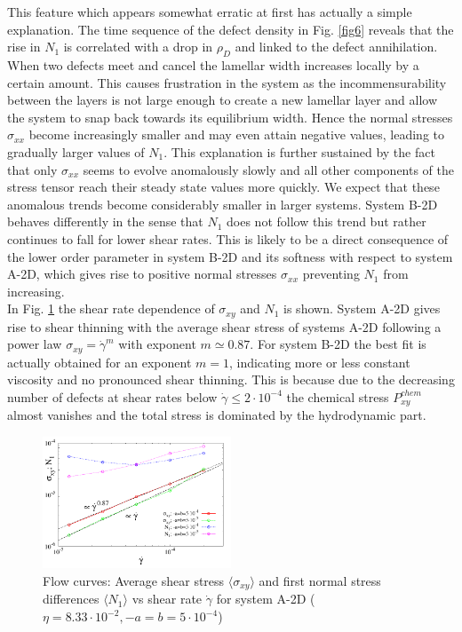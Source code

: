 \documentclass[8.5pt,twoside,twocolumn]{article}
\newcommand{\e}[1]{\cdot10^{#1}}
\begin{document}
This feature which appears somewhat erratic at first has actually a simple explanation. 
The time sequence of the defect density in Fig. \ref{fig6} reveals that the rise in $N_1$ is correlated with a drop in $\rho_D$ and linked to the defect annihilation.
When two defects meet and cancel the lamellar width increases locally by a certain amount.
This causes frustration in the system as the incommensurability between the layers is not large enough to create a new lamellar layer and allow the system to snap back towards its equilibrium width.
Hence the normal stresses $\sigma_{xx}$ become increasingly smaller and may even attain negative values, leading to gradually larger values of $N_1$.
This explanation is further sustained by the fact that only $\sigma_{xx}$ seems to evolve anomalously slowly and all other components of the stress tensor reach their steady state values more quickly.
We expect that these anomalous trends become considerably smaller in larger systems.
System B-2D behaves differently in the sense that $N_1$ does not follow this trend but rather continues to fall for lower shear rates. 
This is likely to be a direct consequence of the lower order parameter in system B-2D and its softness with respect to system A-2D, which gives rise to positive normal stresses $\sigma_{xx}$ preventing $N_1$ from increasing.\\
In Fig. \ref{fig11} the shear rate dependence of $\sigma_{xy}$ and $N_1$ is shown. 
System A-2D gives rise to shear thinning with the average shear stress of systems A-2D following a power law $\sigma_{xy}=\dot{\gamma}^m$ with exponent $m\simeq 0.87$.
For system B-2D the best fit is actually obtained for an exponent $m=1$, indicating more or less constant viscosity and no pronounced shear thinning.
This is because due to the decreasing number of defects at shear rates below $\dot{\gamma}\le2\e{-4}$ the chemical stress $P^{chem}_{xy}$ almost vanishes and the total stress is dominated by the hydrodynamic part.\\


\begin{figure}[htp!]
\centering
\includegraphics[angle=0,width=0.5\textwidth]{S_xy_N1_gammadot.pdf}
\caption{Flow curves: Average shear stress $\langle \sigma_{xy}\rangle$ and first normal stress differences $\langle N_1 \rangle$ vs shear rate $\dot{\gamma}$ for system A-2D ($\eta=8.33\cdot10^{-2}, -a=b=5\cdot 10^{-4}$)} 
\label{fig11}
\end{figure}
\end{document}
